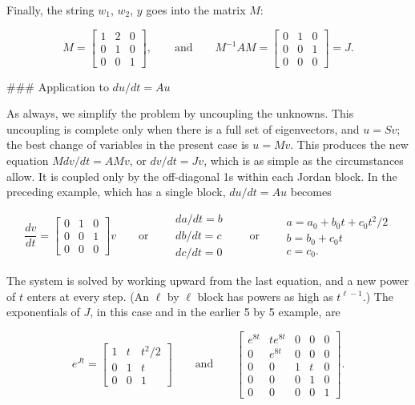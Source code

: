 Finally, the string \(w_{1}\), \(w_{2}\), \(y\) goes into the matrix \(M\):

\[M=\begin{bmatrix}1&2&0\\ 0&1&0\\ 0&0&1\end{bmatrix},\qquad\text{and}\qquad M^{-1}AM=\begin{bmatrix}0&1&0\\ 0&0&1\\ 0&0&0\end{bmatrix}=J.\]

### Application to \(du/dt=Au\)

As always, we simplify the problem by uncoupling the unknowns. This uncoupling is complete only when there is a full set of eigenvectors, and \(u=Sv\); the best change of variables in the present case is \(u=Mv\). This produces the new equation \(Mdv/dt=AMv\), or \(dv/dt=Jv\), which is as simple as the circumstances allow. It is coupled only by the off-diagonal 1s within each Jordan block. In the preceding example, which has a single block, \(du/dt=Au\) becomes

\[\frac{dv}{dt}=\begin{bmatrix}0&1&0\\ 0&0&1\\ 0&0&0\end{bmatrix}v\qquad\text{or}\qquad\begin{array}{c}da/dt=b\\ db/dt=c\\ dc/dt=0\end{array}\qquad\text{or}\qquad\begin{array}{c}a=a_{0}+b_{0}t+c_{0}t^ {2}/2\\ b=b_{0}+c_{0}t\\ c=c_{0}.\end{array}\]

The system is solved by working upward from the last equation, and a new power of \(t\) enters at every step. (An \(\ell\) by \(\ell\) block has powers as high as \(t^{\ell-1}\).) The exponentials of \(J\), in this case and in the earlier 5 by 5 example, are

\[e^{Jt}=\begin{bmatrix}1&t&t^{2}/2\\ 0&1&t\\ 0&0&1\end{bmatrix}\qquad\text{and}\qquad\begin{bmatrix}e^{8t}&te^{8t}&0&0&0\\ 0&e^{8t}&0&0&0\\ 0&0&1&t&0\\ 0&0&0&1&0\\ 0&0&0&0&1\end{bmatrix}.\]

